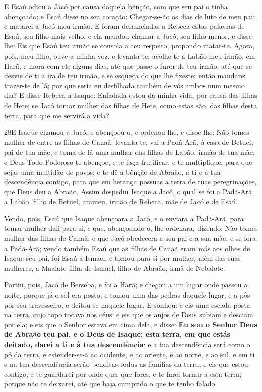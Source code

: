 E Esaú odiou a Jacó por causa daquela bênção, com que seu pai o
tinha abençoado; e Esaú disse no seu coração: Chegar-se-ão os dias
de luto de meu pai; e matarei a Jacó meu irmão. E foram
denunciadas a Rebeca estas palavras de Esaú, seu filho mais velho; e
ela mandou chamar a Jacó, seu filho menor, e disse-lhe: Eis que Esaú
teu irmão se consola a teu respeito, propondo matar-te.
Agora, pois, meu filho, ouve a minha voz, e levanta-te;
acolhe-te a Labão meu irmão, em Harã, e mora com ele alguns
dias, até que passe o furor de teu irmão; até que se desvie
de ti a ira de teu irmão, e se esqueça do que lhe fizeste; então
mandarei trazer-te de lá; por que seria eu desfilhada também de vós
ambos num mesmo dia? E disse Rebeca a Isaque: Enfadada estou
da minha vida, por causa das filhas de Hete; se Jacó tomar mulher
das filhas de Hete, como estas são, das filhas desta terra, para que
me servirá a vida?

\smallskip

\lettrine{28} E Isaque chamou a Jacó, e abençoou-o, e
ordenou-lhe, e disse-lhe: Não tomes mulher de entre as filhas de
Canaã; levanta-te, vai a Padã-Arã, à casa de Betuel, pai de tua
mãe, e toma de lá uma mulher das filhas de Labão, irmão de tua mãe;
e Deus Todo-Poderoso te abençoe, e te faça frutificar, e te
multiplique, para que sejas uma multidão de povos; e te dê a
bênção de Abraão, a ti e à tua descendência contigo, para que em
herança possuas a terra de tuas peregrinações, que Deus deu a
Abraão. Assim despediu Isaque a Jacó, o qual se foi a Padã-Arã,
a Labão, filho de Betuel, arameu, irmão de Rebeca, mãe de Jacó e de
Esaú.

Vendo, pois, Esaú que Isaque abençoara a Jacó, e o enviara a
Padã-Arã, para tomar mulher dali para si, e que, abençoando-o, lhe
ordenara, dizendo: Não tomes mulher das filhas de Canaã; e que
Jacó obedecera a seu pai e a sua mãe, e se fora a Padã-Arã;
vendo também Esaú que as filhas de Canaã eram más aos olhos de
Isaque seu pai, foi Esaú a Ismael, e tomou para si por mulher,
além das suas mulheres, a Maalate filha de Ismael, filho de Abraão,
irmã de Nebaiote.

Partiu, pois, Jacó de Berseba, e foi a Harã; e chegou a um
lugar onde passou a noite, porque já o sol era posto; e tomou uma
das pedras daquele lugar, e a pôs por seu travesseiro, e deitou-se
naquele lugar. E sonhou: e eis uma escada posta na terra,
cujo topo tocava nos céus; e eis que os anjos de Deus subiam e
desciam por ela; e eis que o Senhor estava em cima dela, e
disse: \textbf{Eu sou o Senhor Deus de Abraão teu pai, e o Deus de
Isaque; esta terra, em que estás deitado, darei a ti e à tua
descendência};  e a tua descendência será como o pó da terra,
e estender-se-á ao ocidente, e ao oriente, e ao norte, e ao sul, e
em ti e na tua descendência serão benditas todas as famílias da
terra; e eis que estou contigo, e te guardarei por onde quer
que fores, e te farei tornar a esta terra; porque não te deixarei,
até que haja cumprido o que te tenho falado.

